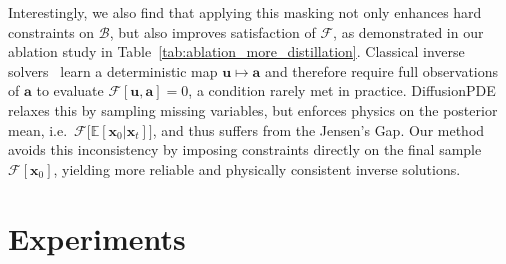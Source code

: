 \documentclass{article}
\theoremstyle{plain}
\theoremstyle{definition}
\theoremstyle{remark}
\def\va{{\bm{a}}}
\def\vu{{\bm{u}}}
\def\vx{{\bm{x}}}
\begin{document}
Interestingly, we also find that applying this masking not only enhances hard constraints on $\mathcal{B}$, but also improves satisfaction of $\mathcal{F}$, as demonstrated in our ablation study in Table~\ref{tab:ablation_more_distillation}.
Classical inverse solvers~\cite{li2020fno,li2024pino,lu2019deeponet,raissi2019pinn} learn a deterministic map \(\vu\!\mapsto\!\va\) and therefore require full observations of \(\va\) to evaluate \(\mathcal{F}[\vu,\va]=0\), a condition rarely met in practice. DiffusionPDE~\cite{huang2024diffusionpde} relaxes this by sampling missing variables, but enforces physics on the posterior mean, i.e.\ \(\mathcal{F}\bigl[\mathbb{E}[\vx_0|\vx_t]\bigr]\), and thus suffers from the Jensen’s Gap. Our method avoids this inconsistency by imposing constraints directly on the final sample \(\mathcal{F}[\vx_0]\), yielding more reliable and physically consistent inverse solutions.











\section{Experiments}
\end{document}
